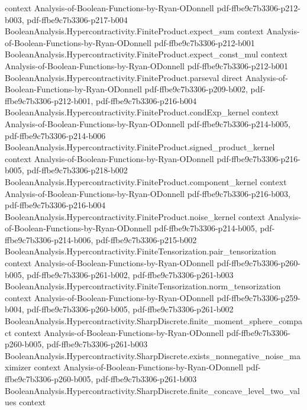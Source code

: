 \begin{theorem}
  {context}
  {Analysis-of-Boolean-Functions-by-Ryan-ODonnell}
  {pdf-ffbe9c7b3306-p212-b003,
    pdf-ffbe9c7b3306-p217-b004}
\proofstep
  {BooleanAnalysis.Hypercontractivity.FiniteProduct.expect_sum}
  {context}
  {Analysis-of-Boolean-Functions-by-Ryan-ODonnell}
  {pdf-ffbe9c7b3306-p212-b001}
\proofstep
  {BooleanAnalysis.Hypercontractivity.FiniteProduct.expect_const_mul}
  {context}
  {Analysis-of-Boolean-Functions-by-Ryan-ODonnell}
  {pdf-ffbe9c7b3306-p212-b001}
\proofstep
  {BooleanAnalysis.Hypercontractivity.FiniteProduct.parseval}
  {direct}
  {Analysis-of-Boolean-Functions-by-Ryan-ODonnell}
  {pdf-ffbe9c7b3306-p209-b002,
    pdf-ffbe9c7b3306-p212-b001,
    pdf-ffbe9c7b3306-p216-b004}
\proofstep
  {BooleanAnalysis.Hypercontractivity.FiniteProduct.condExp_kernel}
  {context}
  {Analysis-of-Boolean-Functions-by-Ryan-ODonnell}
  {pdf-ffbe9c7b3306-p214-b005,
    pdf-ffbe9c7b3306-p214-b006}
\proofstep
  {BooleanAnalysis.Hypercontractivity.FiniteProduct.signed_product_kernel}
  {context}
  {Analysis-of-Boolean-Functions-by-Ryan-ODonnell}
  {pdf-ffbe9c7b3306-p216-b005,
    pdf-ffbe9c7b3306-p218-b002}
\proofstep
  {BooleanAnalysis.Hypercontractivity.FiniteProduct.component_kernel}
  {context}
  {Analysis-of-Boolean-Functions-by-Ryan-ODonnell}
  {pdf-ffbe9c7b3306-p216-b003,
    pdf-ffbe9c7b3306-p216-b004}
\proofstep
  {BooleanAnalysis.Hypercontractivity.FiniteProduct.noise_kernel}
  {context}
  {Analysis-of-Boolean-Functions-by-Ryan-ODonnell}
  {pdf-ffbe9c7b3306-p214-b005,
    pdf-ffbe9c7b3306-p214-b006,
    pdf-ffbe9c7b3306-p215-b002}
\proofstep
  {BooleanAnalysis.Hypercontractivity.FiniteTensorization.pair_tensorization}
  {context}
  {Analysis-of-Boolean-Functions-by-Ryan-ODonnell}
  {pdf-ffbe9c7b3306-p260-b005,
    pdf-ffbe9c7b3306-p261-b002,
    pdf-ffbe9c7b3306-p261-b003}
\proofstep
  {BooleanAnalysis.Hypercontractivity.FiniteTensorization.norm_tensorization}
  {context}
  {Analysis-of-Boolean-Functions-by-Ryan-ODonnell}
  {pdf-ffbe9c7b3306-p259-b004,
    pdf-ffbe9c7b3306-p260-b005,
    pdf-ffbe9c7b3306-p261-b002}
\proofstep
  {BooleanAnalysis.Hypercontractivity.SharpDiscrete.finite_moment_sphere_compact}
  {context}
  {Analysis-of-Boolean-Functions-by-Ryan-ODonnell}
  {pdf-ffbe9c7b3306-p260-b005,
    pdf-ffbe9c7b3306-p261-b003}
\proofstep
  {BooleanAnalysis.Hypercontractivity.SharpDiscrete.exists_nonnegative_noise_maximizer}
  {context}
  {Analysis-of-Boolean-Functions-by-Ryan-ODonnell}
  {pdf-ffbe9c7b3306-p260-b005,
    pdf-ffbe9c7b3306-p261-b003}
\proofstep
  {BooleanAnalysis.Hypercontractivity.SharpDiscrete.finite_concave_level_two_values}
  {context}

\end{theorem}
